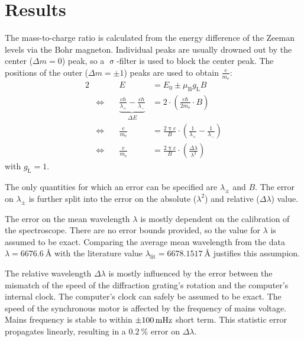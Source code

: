 \chapter{Results}
The mass-to-charge ratio is calculated from the energy difference of the Zeeman levels via the Bohr magneton.
Individual peaks are usually drowned out by the center ($\Delta m = 0$) peak, so a $\upsigma$-filter is used to block the center peak.
The positions of the outer ($\Delta m = \pm 1$) peaks are used to obtain $\frac{e}{m_\text{e}}$:
\begin{alignat}{2}
	& &E &= E_0 \pm \mu_\text{B} g_\text{L} B\\
	&\Leftrightarrow \quad &\underbrace{\frac{c h}{\lambda_+} - \frac{c h}{\lambda_-}}_{\Delta E} &=
	2 \cdot \left(\frac{e \hbar}{2 m_\text{e}} \cdot B \right)\\
	&\Leftrightarrow &\frac{e}{m_\text{e}} &= \frac{2 \uppi c}{B} \cdot \left(\frac{1}{\lambda_+} - \frac{1}{\lambda_-}\right)\\
	&\Leftrightarrow &\frac{e}{m_\text{e}} &= \frac{2 \uppi c}{B} \cdot \left(\frac{\Delta \lambda}{\lambda^2}\right)
\end{alignat}
with $g_\text{L} = 1$.

The only quantities for which an error can be specified are $\lambda_\pm$ and $B$.
The error on $\lambda_\pm$ is further split into the error on the absolute ($\lambda^2$) and relative ($\Delta \lambda$) value.

The error on the mean wavelength $\lambda$ is mostly dependent on the calibration of the spectroscope.
There are no error bounds provided, so the value for $\lambda$ is assumed to be exact. 
Comparing the average mean wavelength from the data $\lambda = \SI{6676.6}{\angstrom}$ with the literature value $\lambda_\text{lit} = \SI{6678.1517}{\angstrom}$ justifies this assumpion.

The relative wavelength $\Delta \lambda$ is mostly influenced by the error between the mismatch of the speed of the diffraction grating's rotation and the computer's internal clock.
The computer's clock can safely be assumed to be exact.
The speed of the synchronous motor is affected by the frequency of mains voltage.
Mains frequency is stable to within $\SI{\pm 100}{\milli\hertz}$ short term.
This statistic error propagates linearly, resulting in a $\SI{0.2}{\percent}$ error on $\Delta\lambda$.

